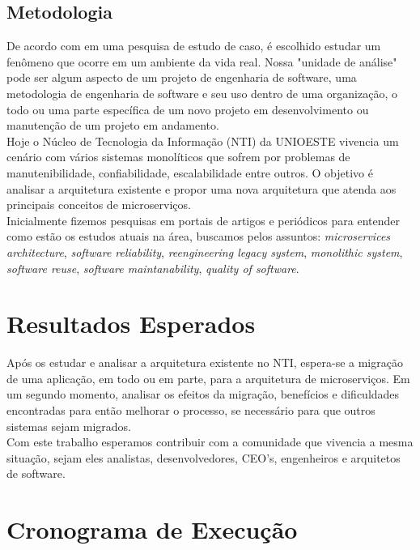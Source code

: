 \documentclass[12pt]{article}
\begin{document}
\subsection{Metodologia}
De acordo com \cite{PERRUNESON2012} em uma pesquisa de estudo de caso, é escolhido estudar um fenômeno que ocorre em um ambiente da vida real. Nossa "unidade de análise"\hspace{0.05cm} pode ser algum aspecto de um projeto de engenharia de software, uma metodologia de engenharia de software e seu uso dentro de uma organização, o todo ou uma parte específica de um novo projeto em desenvolvimento ou manutenção de um projeto em andamento.
\\Hoje o Núcleo de Tecnologia da Informação (NTI) da UNIOESTE vivencia um cenário com vários sistemas monolíticos que sofrem por problemas de manutenibilidade, confiabilidade, escalabilidade entre outros. O objetivo é analisar a arquitetura existente e propor uma nova arquitetura que atenda aos principais conceitos de microserviços.
\\Inicialmente fizemos pesquisas em portais de artigos e periódicos para entender como estão os estudos atuais na área, buscamos pelos assuntos: \textit{microservices architecture}, \textit{software reliability}, \textit{reengineering legacy system}, \textit{monolithic system}, \textit{software reuse}, \textit{software maintanability}, \textit{quality of software}.
 
\section{Resultados Esperados}

Após os estudar e analisar a arquitetura existente no NTI, espera-se a migração de uma aplicação, em todo ou em parte, para a arquitetura de microserviços. Em um segundo momento, analisar os efeitos da migração, benefícios e dificuldades encontradas para então melhorar o processo, se necessário para que outros sistemas sejam migrados.
\\ Com este trabalho esperamos contribuir com a comunidade que vivencia a mesma situação, sejam eles analistas, desenvolvedores, CEO's, engenheiros e arquitetos de software.

\section{Cronograma de Execução}
\end{document}
